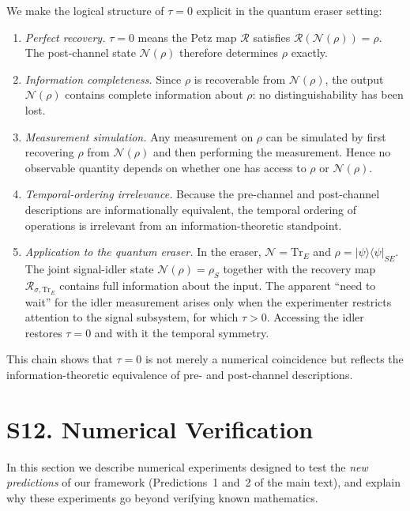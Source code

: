 \documentclass[prl,twocolumn,superscriptaddress,longbibliography]{revtex4-2}
\newcommand{\Tr}{\mathrm{Tr}}
\newcommand{\Petz}{\mathcal{R}}
\newcommand{\chan}{\mathcal{N}}
\newcommand{\ket}[1]{|#1\rangle}
\newcommand{\bra}[1]{\langle#1|}
\newcommand{\tauasym}{\tau}
\begin{document}
We make the logical structure of $\tauasym = 0$ explicit in the
quantum eraser setting:

\begin{enumerate}
\item \emph{Perfect recovery.}  $\tauasym = 0$ means the Petz map
  $\Petz$ satisfies $\Petz(\chan(\rho)) = \rho$.  The post-channel
  state $\chan(\rho)$ therefore determines $\rho$ exactly.
\item \emph{Information completeness.}  Since $\rho$ is
  recoverable from $\chan(\rho)$, the output $\chan(\rho)$ contains
  complete information about $\rho$: no distinguishability has
  been lost.
\item \emph{Measurement simulation.}  Any measurement on $\rho$
  can be simulated by first recovering $\rho$ from $\chan(\rho)$
  and then performing the measurement.  Hence no observable
  quantity depends on whether one has access to $\rho$ or
  $\chan(\rho)$.
\item \emph{Temporal-ordering irrelevance.}  Because the
  pre-channel and post-channel descriptions are
  informationally equivalent, the temporal ordering of
  operations is irrelevant from an information-theoretic
  standpoint.
\item \emph{Application to the quantum eraser.}  In the eraser,
  $\chan = \Tr_E$ and $\rho = \ket{\psi}\!\bra{\psi}_{SE}$.  The
  joint signal-idler state $\chan(\rho) = \rho_S$ together with
  the recovery map $\Petz_{\sigma,\Tr_E}$ contains full
  information about the input.  The apparent ``need to wait''
  for the idler measurement arises only when the experimenter
  restricts attention to the signal subsystem, for which
  $\tauasym > 0$.  Accessing the idler restores $\tauasym = 0$
  and with it the temporal symmetry.
\end{enumerate}

This chain shows that $\tauasym = 0$ is not merely a numerical
coincidence but reflects the information-theoretic equivalence
of pre- and post-channel descriptions.

\section{S12. Numerical Verification}
\label{sec:numerical}

In this section we describe numerical experiments designed to test the
\emph{new predictions} of our framework (Predictions~1 and~2 of the
main text), and explain why these experiments go beyond verifying
known mathematics.
\end{document}
